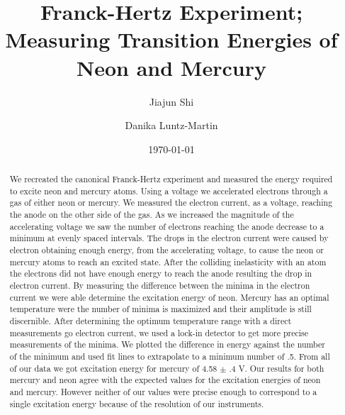 \documentclass[prb,preprint]{revtex4-1}
\begin{document}
\title{Franck-Hertz Experiment; Measuring Transition Energies of Neon and Mercury}

\author{Jiajun Shi}


\author{Danika Luntz-Martin}


\date{\today}

\begin{abstract}

We recreated the canonical Franck-Hertz experiment and measured the energy required to excite neon and mercury atoms. Using a voltage we accelerated electrons through a gas of either neon or mercury. We measured the electron current, as a voltage, reaching the anode on the other side of the gas. As we increased the magnitude of the accelerating voltage we saw the number of electrons reaching the anode decrease to a minimum at evenly spaced intervals. The drops in the electron current were caused by electron obtaining enough energy, from the accelerating voltage, to cause the neon or mercury atoms to reach an excited state. After the colliding inelasticity with an atom the electrons did not have enough energy to reach the anode resulting the drop in electron current. By measuring the difference between the minima in the electron current we were able determine the excitation energy of neon. Mercury has an optimal temperature were the number of minima is maximized and their amplitude is still discernible. After determining the optimum temperature range with a direct measurements go electron current, we used a lock-in detector to get more precise measurements of the minima. We plotted the difference in energy against the number of the minimum and used fit lines to extrapolate to a minimum number of .5. From all of our data we got excitation energy for mercury of 4.58 $\pm$ .4 V. Our results for both mercury and neon agree with the expected values for the excitation energies of neon and mercury. However neither of our values were precise enough to correspond to a single excitation energy because of the resolution of our instruments.

\end{abstract}


\maketitle 
\end{document}
